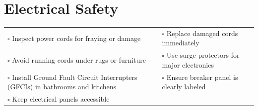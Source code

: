 
\section{Electrical Safety}
\label{sec:electrical}

\begin{tabular}{p{9cm} p{8cm}}
$\square$ Inspect power cords for fraying or damage & $\square$ Replace damaged cords immediately \\ 
$\square$ Avoid running cords under rugs or furniture & $\square$ Use surge protectors for major electronics \\ 
$\square$ Install Ground Fault Circuit Interrupters (GFCIs) in bathrooms and kitchens &  $\square$ Ensure breaker panel is clearly labeled \\ 
$\square$ Keep electrical panels accessible & \\ 
\end{tabular}

